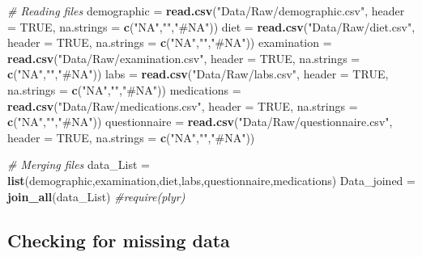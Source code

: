 \documentclass[]{article}
\newenvironment{Shaded}{\begin{snugshade}}{\end{snugshade}}
\newcommand{\CommentTok}[1]{\textcolor[rgb]{0.56,0.35,0.01}{\textit{#1}}}
\newcommand{\DataTypeTok}[1]{\textcolor[rgb]{0.13,0.29,0.53}{#1}}
\newcommand{\KeywordTok}[1]{\textcolor[rgb]{0.13,0.29,0.53}{\textbf{#1}}}
\newcommand{\NormalTok}[1]{#1}
\newcommand{\OtherTok}[1]{\textcolor[rgb]{0.56,0.35,0.01}{#1}}
\newcommand{\StringTok}[1]{\textcolor[rgb]{0.31,0.60,0.02}{#1}}
\begin{document}
\begin{Shaded}
\begin{Highlighting}[]
\CommentTok{# Reading files}
\NormalTok{demographic   =}\StringTok{ }\KeywordTok{read.csv}\NormalTok{(}\StringTok{"Data/Raw/demographic.csv"}\NormalTok{, }\DataTypeTok{header =} \OtherTok{TRUE}\NormalTok{, }\DataTypeTok{na.strings =} \KeywordTok{c}\NormalTok{(}\StringTok{"NA"}\NormalTok{,}\StringTok{""}\NormalTok{,}\StringTok{"#NA"}\NormalTok{))}
\NormalTok{diet          =}\StringTok{ }\KeywordTok{read.csv}\NormalTok{(}\StringTok{"Data/Raw/diet.csv"}\NormalTok{, }\DataTypeTok{header =} \OtherTok{TRUE}\NormalTok{, }\DataTypeTok{na.strings =} \KeywordTok{c}\NormalTok{(}\StringTok{"NA"}\NormalTok{,}\StringTok{""}\NormalTok{,}\StringTok{"#NA"}\NormalTok{))}
\NormalTok{examination   =}\StringTok{ }\KeywordTok{read.csv}\NormalTok{(}\StringTok{"Data/Raw/examination.csv"}\NormalTok{, }\DataTypeTok{header =} \OtherTok{TRUE}\NormalTok{, }\DataTypeTok{na.strings =} \KeywordTok{c}\NormalTok{(}\StringTok{"NA"}\NormalTok{,}\StringTok{""}\NormalTok{,}\StringTok{"#NA"}\NormalTok{))}
\NormalTok{labs          =}\StringTok{ }\KeywordTok{read.csv}\NormalTok{(}\StringTok{"Data/Raw/labs.csv"}\NormalTok{, }\DataTypeTok{header =} \OtherTok{TRUE}\NormalTok{, }\DataTypeTok{na.strings =} \KeywordTok{c}\NormalTok{(}\StringTok{"NA"}\NormalTok{,}\StringTok{""}\NormalTok{,}\StringTok{"#NA"}\NormalTok{))}
\NormalTok{medications   =}\StringTok{ }\KeywordTok{read.csv}\NormalTok{(}\StringTok{"Data/Raw/medications.csv"}\NormalTok{, }\DataTypeTok{header =} \OtherTok{TRUE}\NormalTok{, }\DataTypeTok{na.strings =} \KeywordTok{c}\NormalTok{(}\StringTok{"NA"}\NormalTok{,}\StringTok{""}\NormalTok{,}\StringTok{"#NA"}\NormalTok{))}
\NormalTok{questionnaire =}\StringTok{ }\KeywordTok{read.csv}\NormalTok{(}\StringTok{"Data/Raw/questionnaire.csv"}\NormalTok{, }\DataTypeTok{header =} \OtherTok{TRUE}\NormalTok{, }\DataTypeTok{na.strings =} \KeywordTok{c}\NormalTok{(}\StringTok{"NA"}\NormalTok{,}\StringTok{""}\NormalTok{,}\StringTok{"#NA"}\NormalTok{))}

\CommentTok{# Merging files}
\NormalTok{data_List =}\StringTok{ }\KeywordTok{list}\NormalTok{(demographic,examination,diet,labs,questionnaire,medications)}
\NormalTok{Data_joined =}\StringTok{ }\KeywordTok{join_all}\NormalTok{(data_List) }\CommentTok{#require(plyr)}
\end{Highlighting}
\end{Shaded}

\hypertarget{checking-for-missing-data}{%
\subsection{Checking for missing data}\label{checking-for-missing-data}}
\end{document}
